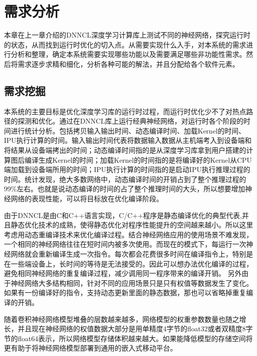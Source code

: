 
\chapter{需求分析}
本章在上一章介绍的DNNCL深度学习计算库上测试不同的神经网络，探究运行时的状态，从而找到运行时优化的切入点。从需要实现什么入手，对本系统的需求进行分析和整理，确定本系统需要实现哪些功能以及需要满足哪些非功能性需求。然后将需求逐步求精和细化，分析各种可能的解法，并且分配给各个软件元素。

\section{需求挖掘}
本系统的主要目标是优化深度学习库的运行时过程，而运行时优化少不了对热点路径的探测和优化。通过在DNNCL库上运行经典神经网络，对运行时各个阶段的时间进行统计分析。包括拷贝输入输出时间、动态编译时间、加载Kernel的时间、IPU执行计算的时间。输入输出时间代表将数据输入数据从主机端考入到设备端和将结果从设备端拷出的时间；动态编译时间指的是从深度学习库拿到用户搭建的计算图后编译生成Kernel的时间；加载Kernel的时间指的是将编译好的Kernel从CPU端加载到设备端所用的时间；IPU执行计算的时间指的是启动IPU执行推理过程的时间。统计发现，绝大多数网络中，动态编译时间的开销占到了整个推理过程的99\%左右。也就是说动态编译的时间的占了整个推理时间的大头，所以想要增加神经网络的表现性能，可以将目标放在优化编译阶段。

由于DNNCL是由C和C++语言实现，C/C++程序是静态编译优化的典型代表,并且静态优化技术的成熟，使得静态优化对程序性能提升的空间越来越小。所以这里考虑用动态重编译技术来优化编译过程。结合神经网络应用的使用场景不难发现，一个相同的神经网络往往在短时间内被多次使用。而现在的模式下，每运行一次神经网络就会重新编译生成一次指令。每次都会花费很多时间在编译指令上，特别是在一些端设备上，长时间的等待是无法接受的。因此可以想办法优化编译的过程，避免相同神经网络的重复编译过程，减少调用同一程序带来的编译开销。
另外由于神经网络大多结构相同，针对不同的应用场景只是只有权值等数据发生了变化。如果有一份编译好的指令，支持动态更新里面的静态数据，那也可以省略掉重复编译的开销。

随着卷积神经网络模型堆叠的层数越来越多，网络模型的权重参数数量也随之增长，并且现在神经网络的权值数据大部分是用单精度4字节的float32或者双精度8字节的float64表示，所以网络模型存储体积越来越大。如果能降低模型的存储空间将更有助于将神经网络模型部署到通用的嵌入式移动平台。


